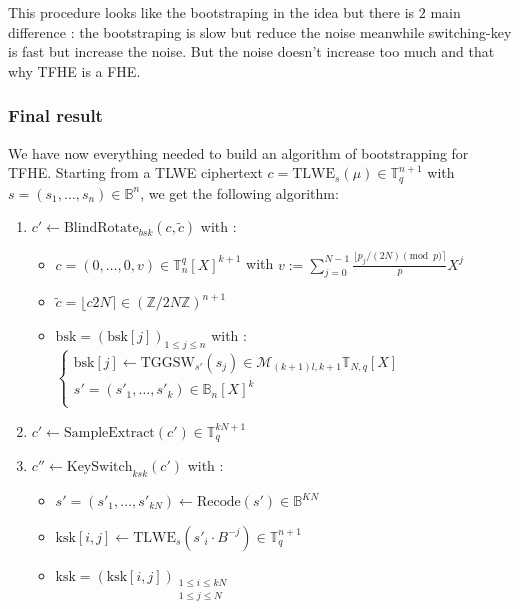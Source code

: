 \documentclass{article}
\newcommand{\Z}{\mathbb{Z}}
\newcommand{\T}{\mathbb{T}}
\newcommand{\B}{\mathbb{B}}
\newcommand{\round}[1]{\lfloor#1\rceil}
\theoremstyle{definition}
\theoremstyle{Theorem}
\begin{document}
This procedure looks like the bootstraping in the idea but there is $2$ main difference : the bootstraping is slow but reduce the noise meanwhile switching-key is fast but increase the noise. But the noise doesn't increase too much and that why TFHE is a FHE. 

\subsubsection{Final result}

We have now everything needed to build an algorithm of bootstrapping for TFHE. Starting from a TLWE ciphertext $c = \text{TLWE}_s(\mu)\in\T_q^{n+1}$ with $s = (s_1,\ldots,s_n)\in\B^n$, we get the following algorithm:

\begin{enumerate}
    \item $c'\gets \text{BlindRotate}_{bsk}(c, \tilde{c})$ with :
    \begin{itemize}
        \item $c = (0, \dots, 0, v)\in\T_n^q[X]^{k+1}$
        with $v:=\sum_{j=0}^{N-1}\frac{\round{p_j/(2N)\pmod{p}}}{p}X^j$
        \item $\tilde{c}=\round{c2N}\in(\Z/2N\Z)^{n+1}$
        \item $\text{bsk} = (\text{bsk}[j])_{1\le j\le n}$ with :
        $
        \begin{cases}
        
            \text{bsk}[j]\gets\text{TGGSW}_{s'}(s_j)\in\mathcal{M}_{(k+1)l,k+1}\T_{N,q}[X] \\
            s'=(s'_1,\dots, s'_k)\in\B_n[X]^k\\
        \end{cases}
        $
    \end{itemize}
    \item $c'\gets\text{SampleExtract}(c')\in\T_q^{kN+1}$
    \item $c'' \gets \text{KeySwitch}_{ksk}(c')$ with : 
    \begin{itemize}
        \item $s'=(s'_1,\dots, s'_{kN})\gets\text{Recode}(s')\in\B^{KN}$
        \item $\text{ksk}[i,j]\gets\text{TLWE}_s(s'_i\cdot B^{-j})\in\T_q^{n+1}$
        \item $\text{ksk}=(\text{ksk}[i,j])_{\substack{1\le i \le kN \\ 1\le j \le N}}$
    \end{itemize} 
\end{enumerate}
\end{document}

